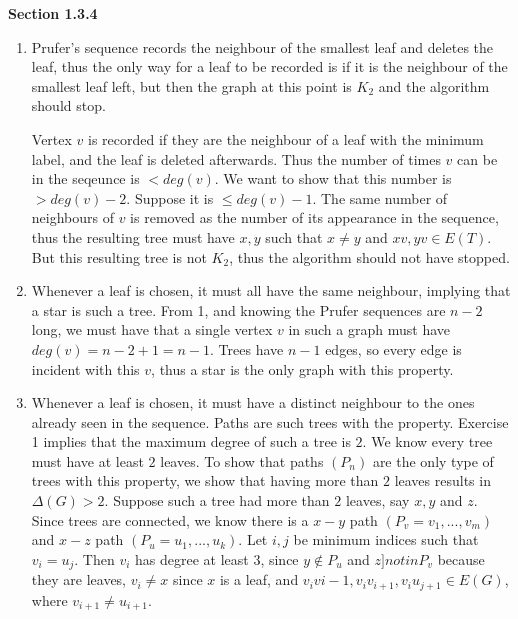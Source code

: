 \documentclass[11pt]{article}
\begin{document}
{\bfseries Section 1.3.4}

\begin{enumerate}[1]
    \item %
        Prufer's sequence records the neighbour of the smallest leaf and deletes
        the leaf, thus the only way for a leaf to be recorded is if it is the 
        neighbour of the smallest leaf left, but then the graph at this point 
        is $K_2$ and the algorithm should stop. 

        Vertex $v$ is recorded if they are the neighbour of a leaf with the
        minimum label, and the leaf is deleted afterwards. Thus the number
        of times $v$ can be in the seqeunce is $ < deg(v)$. We want to show 
        that this number is $ > deg(v) - 2$. Suppose it is $ \leq deg(v) - 1$. 
        The same number of neighbours of $v$ is removed as the number of its
        appearance in the sequence, thus the resulting tree must have $x, y$ 
        such that $x \neq y$ and $xv, yv \in E(T)$. But this resulting tree
        is not $K_2$, thus the algorithm should not have stopped. 

    \addtocounter{enumi}{2}
    \item %
        Whenever a leaf is chosen, it must all have the same neighbour, implying
        that a star is such a tree. From 1, and knowing the Prufer sequences
        are $n - 2$ long, we must have that a single vertex $v$ in such a graph 
        must have $deg(v) = n - 2 + 1 = n - 1$. Trees have $n - 1$ edges, so
        every edge is incident with this $v$, thus a star is the only graph with 
        this property.
    \item %
        Whenever a leaf is chosen, it must have a distinct neighbour to the ones
        already seen in the sequence. Paths are such trees with the property. 
        Exercise 1 implies that the maximum degree of such a tree is $2$. We 
        know every tree must have at least $2$ leaves. To show that paths $(P_n)$
        are the only type of trees with this property, we show that having more 
        than $2$ leaves results in $\Delta(G) > 2$. Suppose such a tree had more 
        than $2$ leaves, say $x, y$ and $z$. Since trees are connected, we know
        there is a $x-y$ path $(P_v = v_1, ..., v_m)$ and $x-z$ path 
        $(P_u = u_1, ..., u_k)$. Let $i, j$ be minimum indices such that 
        $v_i = u_j$. Then $v_i$ has degree at least $3$, since $y \notin P_u$ 
        and $z ]notin P_v$ because they are leaves, $v_i \neq x$ since $x$ is 
        a leaf, and $v_iv{i-1}, v_iv_{i+1}, v_iu_{j+1}\in E(G)$, where
        $v_{i+1} \neq u_{i+1}$. 


\end{enumerate}
\end{document}
